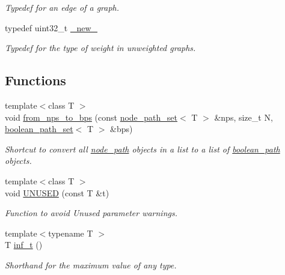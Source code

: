 \begin{DoxyCompactItemize}
\begin{DoxyCompactList}\small\item\em Typedef for an edge of a graph. \end{DoxyCompactList}\item 
typedef uint32\+\_\+t \hyperlink{namespacelgraph_1_1utils_a2c84bfde888c42ab3ad6b2cb8a364240}{\+\_\+new\+\_\+}
\begin{DoxyCompactList}\small\item\em Typedef for the type of weight in unweighted graphs. \end{DoxyCompactList}\end{DoxyCompactItemize}
\subsection*{Functions}
\begin{DoxyCompactItemize}
\item 
{\footnotesize template$<$class T $>$ }\\void \hyperlink{namespacelgraph_1_1utils_ab15212bece1e1a0f3a8f98b26f2a33c8}{from\+\_\+nps\+\_\+to\+\_\+bps} (const \hyperlink{namespacelgraph_1_1utils_a723c115f9865edfab11a90377b9abef4}{node\+\_\+path\+\_\+set}$<$ T $>$ \&nps, size\+\_\+t N, \hyperlink{namespacelgraph_1_1utils_aaf50131e15d771a45620336d6e7a77f8}{boolean\+\_\+path\+\_\+set}$<$ T $>$ \&bps)
\begin{DoxyCompactList}\small\item\em Shortcut to convert all \hyperlink{classlgraph_1_1utils_1_1node__path}{node\+\_\+path} objects in a list to a list of \hyperlink{classlgraph_1_1utils_1_1boolean__path}{boolean\+\_\+path} objects. \end{DoxyCompactList}\item 
{\footnotesize template$<$class T $>$ }\\void \hyperlink{namespacelgraph_1_1utils_a02e9a521f6566b3bd3570cfec6d19db1}{U\+N\+U\+S\+ED} (const T \&t)\hypertarget{namespacelgraph_1_1utils_a02e9a521f6566b3bd3570cfec6d19db1}{}\label{namespacelgraph_1_1utils_a02e9a521f6566b3bd3570cfec6d19db1}

\begin{DoxyCompactList}\small\item\em Function to avoid \textquotesingle{}Unused parameter\textquotesingle{} warnings. \end{DoxyCompactList}\item 
{\footnotesize template$<$typename T $>$ }\\T \hyperlink{namespacelgraph_1_1utils_af61dd7000b978d1a5d6ba67166f7da35}{inf\+\_\+t} ()\hypertarget{namespacelgraph_1_1utils_af61dd7000b978d1a5d6ba67166f7da35}{}\label{namespacelgraph_1_1utils_af61dd7000b978d1a5d6ba67166f7da35}

\begin{DoxyCompactList}\small\item\em Shorthand for the maximum value of any type. \end{DoxyCompactList}\end{DoxyCompactItemize}
